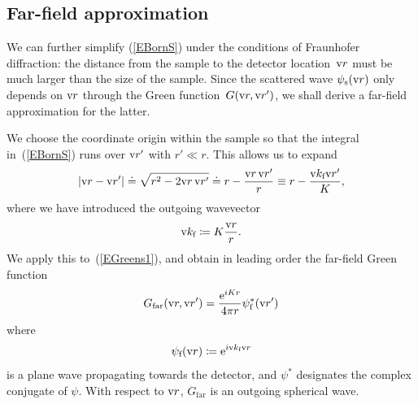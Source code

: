 %

\subsection{Far-field approximation}

%

We can further simplify (\ref{EBornS})
under the conditions of Fraunhofer diffraction:
%
the distance from the sample to the detector location~$\text{v}{r}$
must be much larger than the size of the sample.
Since the scattered wave $\psi_\text{s}(\text{v}{r})$
only depends on $\text{v}{r}$ through the Green function~$G(\text{v}{r},\text{v}{r}')$,
we shall derive a far-field approximation for the latter.

We choose the coordinate origin within the sample
so that the integral in~(\ref{EBornS}) runs over $\text{v}{r}'$ with $r'\ll r$.
This allows us to expand
\begin{equation}
  \left|\text{v}{r}-\text{v}{r}'\right|
  \doteq \sqrt{r^2-2\text{v}{r}\,\text{v}{r}'}
  \doteq r - \frac{\text{v}{r}\,\text{v}{r}'}{r}
  \equiv r - \frac{\text{v}{k}_{\text{f}} \text{v}{r}'}{K},
\end{equation}
%
where we have introduced the outgoing wavevector
\begin{equation}
  \text{v}{k}_{\text{f}}\coloneqq K\frac{\text{v}{r}}{r}.
\end{equation}
We apply this to~(\ref{EGreens1}),
%
and obtain in leading order the far-field Green function
\begin{equation}\label{EGreenFar}
  G_\text{far}(\text{v}{r},\text{v}{r}')
  = \frac{\text{e}^{iKr}}{4\pi r}\psi^*_{\text{f}}(\text{v}{r}')
\end{equation}
where
\begin{equation}
  \psi_{\text{f}}(\text{v}{r}) \coloneqq  \text{e}^{i\text{v}{k}_{\text{f}} \text{v}{r}}
\end{equation}
%
is a plane wave propagating towards the detector,
and $\psi^*$ designates the complex conjugate of $\psi$.
With respect to $\text{v}{r}$, $G_\text{far}$ is an outgoing spherical wave.

